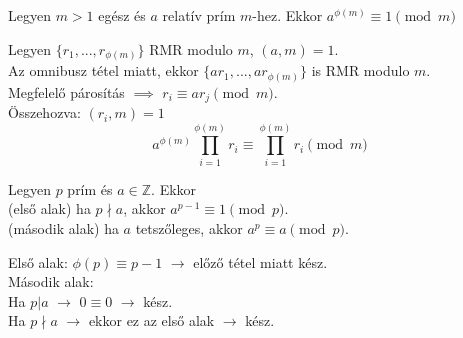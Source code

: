 \documentclass{beamer}
\begin{document}
\begin{frame}

\begin{tcolorbox}[title={Tétel: Euler-Fermat tétel}]
Legyen $m > 1$ egész és $a$ relatív prím $m$-hez. Ekkor $a^{{\phi}(m)} \equiv 1 \pmod{m}$
\end{tcolorbox}

\begin{tcolorbox}[title={Bizonyítás}]
Legyen $\{ r_1, ..., r_{{\phi}(m)}\}$ RMR modulo $m$, $(a, m) = 1$.\\
Az omnibusz tétel miatt, ekkor $\{ ar_1, ..., ar_{{\phi}(m)}\}$ is RMR modulo $m$.\\
Megfelelő párosítás $\implies$ $r_i \equiv ar_j \pmod{m}$.\\
Összehozva: $(r_i, m) = 1$\\
\smallskip
$$a^{{\phi}(m)} \prod^{{\phi}(m)}_{i=1} r_i \equiv \prod^{{\phi}(m)}_{i=1} r_i \pmod{m}$$

\end{tcolorbox}

\end{frame}

\begin{frame}

\begin{tcolorbox}[title={Tétel: (Kis) Fermat tétel}]
Legyen $p$ prím és $a \in \mathbb{Z}$. Ekkor\\
(első alak) ha $p \nmid a$, akkor $a^{p-1} \equiv 1 \pmod{p}$.\\
(második alak) ha $a$ tetszőleges, akkor $a^p \equiv a \pmod{p}$.

\end{tcolorbox}

\begin{tcolorbox}[title={Bizonyítás}]
Első alak: ${\phi}(p) \equiv p - 1$ $\rightarrow$ előző tétel miatt kész.\\
\bigskip
Második alak:\\
Ha $p|a$ $\rightarrow$ $0 \equiv 0$ $\rightarrow$ kész.\\
Ha $p{\nmid}a$ $\rightarrow$ ekkor ez az első alak $\rightarrow$ kész.

\end{tcolorbox}

\end{frame}
\end{document}
